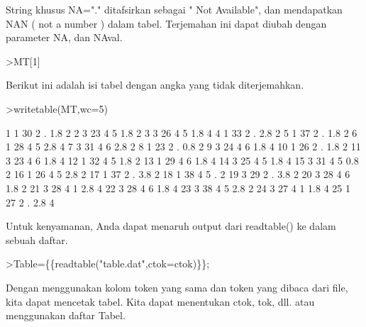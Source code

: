 \documentclass[a4paper,10pt]{article}
\begin{document}
\begin{eulernotebook}
\begin{eulercomment}
\begin{eulercomment}
\begin{eulercomment}
\begin{eulercomment}
\begin{eulercomment}
String khusus NA="." ditafsirkan sebagai " Not Available", dan
mendapatkan NAN ( not a number ) dalam tabel. Terjemahan ini dapat
diubah dengan parameter NA, dan NAval.
\end{eulercomment}
\begin{eulerprompt}
>MT[1]
\end{eulerprompt}
\begin{euleroutput}
  [1,  1,  30,  2,  NAN,  1.8,  2]
\end{euleroutput}
\begin{eulercomment}
Berikut ini adalah isi tabel dengan angka yang tidak diterjemahkan.
\end{eulercomment}
\begin{eulerprompt}
>writetable(MT,wc=5)
\end{eulerprompt}
\begin{euleroutput}
      1    1   30    2    .  1.8    2
      2    3   23    4    5  1.8    2
      3    3   26    4    5  1.8    4
      4    1   33    2    .  2.8    2
      5    1   37    2    .  1.8    2
      6    1   28    4    5  2.8    4
      7    3   31    4    6  2.8    2
      8    1   23    2    .  0.8    2
      9    3   24    4    6  1.8    4
     10    1   26    2    .  1.8    2
     11    3   23    4    6  1.8    4
     12    1   32    4    5  1.8    2
     13    1   29    4    6  1.8    4
     14    3   25    4    5  1.8    4
     15    3   31    4    5  0.8    2
     16    1   26    4    5  2.8    2
     17    1   37    2    .  3.8    2
     18    1   38    4    5    .    2
     19    3   29    2    .  3.8    2
     20    3   28    4    6  1.8    2
     21    3   28    4    1  2.8    4
     22    3   28    4    6  1.8    4
     23    3   38    4    5  2.8    2
     24    3   27    4    1  1.8    4
     25    1   27    2    .  2.8    4
\end{euleroutput}
\begin{eulercomment}
Untuk kenyamanan, Anda dapat menaruh output dari readtable() ke dalam
sebuah daftar.
\end{eulercomment}
\begin{eulerprompt}
>Table=\{\{readtable("table.dat",ctok=ctok)\}\};
\end{eulerprompt}
\begin{eulercomment}
Dengan menggunakan kolom token yang sama dan token yang dibaca dari
file, kita dapat mencetak tabel. Kita dapat menentukan ctok, tok, dll.
atau menggunakan daftar Tabel.
\end{eulercomment}
\begin{eulerprompt}

\end{eulerprompt}
\end{eulercomment}
\end{eulercomment}
\end{eulercomment}
\end{eulercomment}
\end{eulernotebook}
\end{document}
